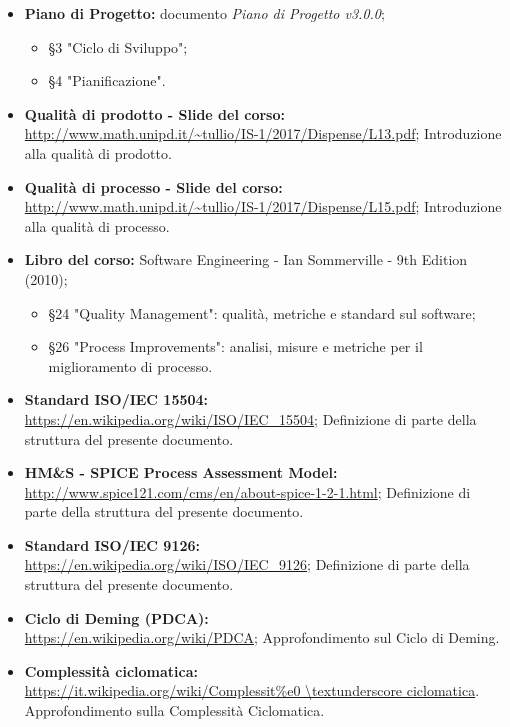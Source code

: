 \documentclass[openany,12pt,a4paper]{report}
\begin{document}
    \begin{itemize}
        \item \textbf{Piano di Progetto:} documento \textit{Piano di Progetto v3.0.0};
	        \begin{itemize}
	        	\item §3 "Ciclo di Sviluppo";
	        	\item §4 "Pianificazione".
	        \end{itemize}
        
        \item \textbf{Qualità di prodotto - Slide del corso:} 
        \\ \url{http://www.math.unipd.it/~tullio/IS-1/2017/Dispense/L13.pdf};
        	\subitem Introduzione alla qualità di prodotto.
        
        \item \textbf{Qualità di processo - Slide del corso:} \\ \url{http://www.math.unipd.it/~tullio/IS-1/2017/Dispense/L15.pdf};
        	\subitem Introduzione alla qualità di processo.
        
        \item \textbf{Libro del corso:} Software Engineering - Ian Sommerville - 9th Edition (2010);
        	\begin{itemize}
        		\item §24 "Quality Management": qualità, metriche e standard sul software;
        		\item §26 "Process Improvements": analisi, misure e metriche per il miglioramento di processo.
        	\end{itemize}
        
        \item \textbf{Standard ISO/IEC 15504:} 
        \\ \url{https://en.wikipedia.org/wiki/ISO/IEC_15504};
        	\subitem Definizione di parte della struttura del presente documento.
        
        \item \textbf{HM\&S - SPICE Process Assessment Model:} 
        \\ \url{http://www.spice121.com/cms/en/about-spice-1-2-1.html};
	        \subitem Definizione di parte della struttura del presente documento.
        \item \textbf{Standard ISO/IEC 9126:}
        \\ \url{https://en.wikipedia.org/wiki/ISO/IEC_9126};
        	\subitem Definizione di parte della struttura del presente documento.
        \item \textbf{Ciclo di Deming (PDCA):} 
        \\ \url{https://en.wikipedia.org/wiki/PDCA};
        	\subitem Approfondimento sul Ciclo di Deming.
        \item \textbf{Complessità ciclomatica:} 
        \\ \url{https://it.wikipedia.org/wiki/Complessit\%e0 \textunderscore ciclomatica}.
        	\subitem Approfondimento sulla Complessità Ciclomatica.
        
    \end{itemize}
\end{document}
